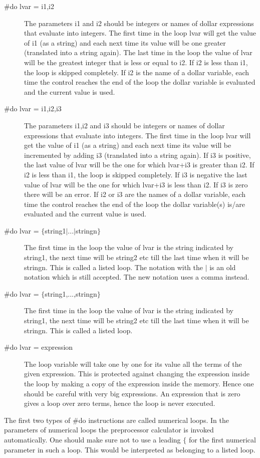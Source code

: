 \begin{description}
\item[\#do lvar = i1,i2] The parameters i1 and i2 should be integers or 
names of dollar expressions that evaluate into integers. The 
first time in the loop lvar will get the value of i1 (as a string) and each 
next time its value will be one greater (translated into a string again). 
The last time in the loop the value of lvar will be the greatest integer 
that is less or equal to i2. If i2 is less than i1, the loop is skipped 
completely. If i2 is the name of a dollar variable, each time the control 
reaches the end of the loop the dollar variable is evaluated and the 
current value is used.
\item[\#do lvar = i1,i2,i3] The parameters i1,i2 and i3 should be integers 
or names of dollar expressions that evaluate into integers. 
The first time in the loop lvar will get the value of i1 (as a string) and 
each next time its value will be incremented by adding i3 (translated into 
a string again). If i3 is positive, the last value of lvar will be the one 
for which lvar+i3 is greater than i2. If i2 is less than i1, the loop is 
skipped completely. If i3 is negative the last value of lvar will be the 
one for which lvar+i3 is less than i2. If i3 is zero there will be an 
error. If i2 or i3 are the names of a dollar variable, each time the control 
reaches the end of the loop the dollar variable(s) is/are evaluated and the 
current value is used.
\item[\#do lvar = $\{$string1$|$...$|$stringn$\}$] The first time in the 
loop the value of lvar is the string indicated by string1, the next time 
will be string2 etc till the last time when it will be stringn. This is 
called a listed loop. The notation 
with the $|$ is an old notation which is still accepted. The new notation 
uses a comma instead.
\item[\#do lvar = $\{$string1,...,stringn$\}$] The first time in the loop 
the value of lvar is the string indicated by string1, the next time will be 
string2 etc till the last time when it will be stringn. This is called a 
listed loop.
\item[\#do lvar = expression] The loop variable will take one by one for 
its value all the terms of the given expression. This is protected against 
changing the expression inside the loop by making a copy of the expression 
inside the memory. Hence one should be careful with very big expressions. 
An expression that is zero gives a loop over zero terms, hence the loop is 
never executed.
\end{description}
The first two types of \#do instructions are called 
numerical loops. In the 
parameters of numerical loops the preprocessor calculator 
is invoked automatically. One should make sure not to use a leading $\{$ 
for the first numerical parameter in such a loop. This would be interpreted 
as belonging to a listed loop.

